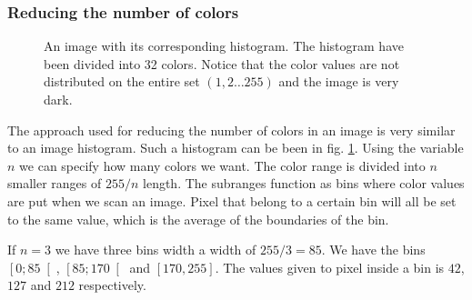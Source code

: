 \documentclass[a4paper, 10pt, final]{article}
\begin{document}
\subsubsection*{Reducing the number of colors}
\begin{figure}[!h]
    \centering
    \caption[]{An image with its corresponding histogram. The histogram
    have been divided into 32 colors. Notice that the color values are
    not distributed on the entire set $(1,2\dots 255)$ and the image is
    very dark.}
    \label{dark_image}
\end{figure}

The approach used for reducing the number of colors in an image is very
similar to an image histogram. Such a histogram can be been in fig.
\ref{dark_image}. Using the variable $n$ we can specify how many colors
we want. The color range is divided into $n$ smaller ranges of $255/n$
length. The subranges function as bins where color values are put when
we scan an image. Pixel that belong to a certain bin will all be set to
the same value, which is the average of the boundaries of the bin.

If $n = 3$ we have three bins width a width of $255/3 = 85$. We have the
bins $\left[0; 85\right[$, $\left[85; 170\right[$ and $\left[170,
255\right]$.  The values given to pixel inside a bin is $42$, $127$ and
$212$ respectively.
\end{document}
